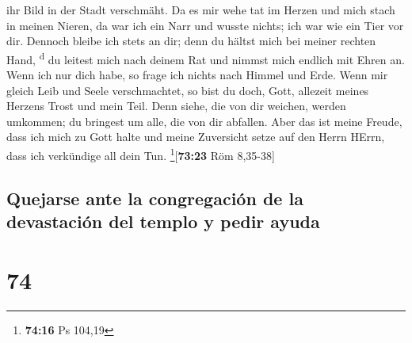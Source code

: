 ihr Bild in der Stadt verschmäht.  Da es mir wehe tat im
Herzen und mich stach in meinen Nieren,  da war ich ein
Narr und wusste nichts; ich war wie ein Tier vor dir. 
Dennoch bleibe ich stets an dir; denn du hältst mich bei meiner rechten
Hand, \textsuperscript{d}  du leitest mich nach deinem
Rat und nimmst mich endlich mit Ehren an.  Wenn ich nur
dich habe, so frage ich nichts nach Himmel und Erde. 
Wenn mir gleich Leib und Seele verschmachtet, so bist du doch, Gott,
allezeit meines Herzens Trost und mein Teil.  Denn siehe,
die von dir weichen, werden umkommen; du bringest um alle, die von dir
abfallen.  Aber das ist meine Freude, dass ich mich zu
Gott halte und meine Zuversicht setze auf den Herrn HErrn, dass ich
verkündige all dein Tun. \footnote{\textbf{74:16} Ps 104,19}{[}\textbf{73:23}
Röm 8,35-38{]}

\hypertarget{quejarse-ante-la-congregaciuxf3n-de-la-devastaciuxf3n-del-templo-y-pedir-ayuda}{%
\subsection{Quejarse ante la congregación de la devastación del templo y
pedir
ayuda}\label{quejarse-ante-la-congregaciuxf3n-de-la-devastaciuxf3n-del-templo-y-pedir-ayuda}}

\hypertarget{section-73}{%
\section{74}\label{section-73}}

